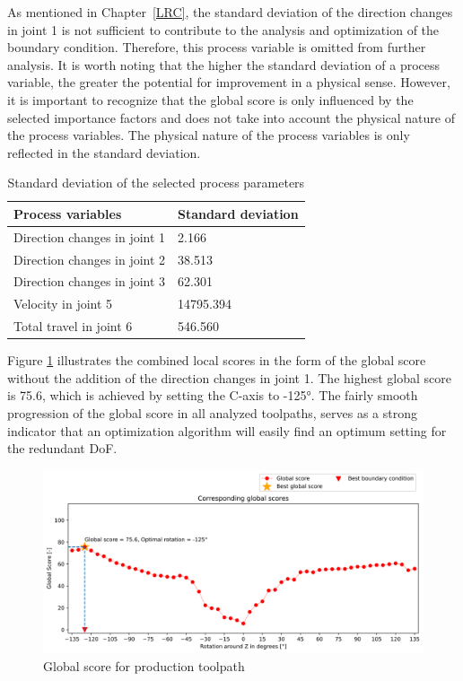 As mentioned in Chapter~\ref{LRC}, the standard deviation of the direction changes in joint 1 is not sufficient to contribute to the analysis and optimization of the boundary condition. Therefore, this process variable is omitted from further analysis. It is worth noting that the higher the standard deviation of a process variable, the greater the potential for improvement in a physical sense. However, it is important to recognize that the global score is only influenced by the selected importance factors and does not take into account the physical nature of the process variables. The physical nature of the process variables is only reflected in the standard deviation.

\begin{table}[H]
	\centering
	\caption{Standard deviation of the selected process parameters}
	\begin{tabular}{||l|l||}
		Process variables & Standard deviation \\
		\hline
		\hline
		\hline
		Direction changes in joint 1	&		2.166 \\
		Direction changes in joint 2	&		38.513 \\
		Direction changes in joint 3	&		62.301 \\
		Velocity in joint 5	&		14795.394 \\
		Total travel in joint 6	&		546.560 \\
		\hline
		\hline
	\end{tabular}
	
	
	\label{Stand}
\end{table}

Figure \ref{GS4} illustrates the combined local scores in the form of the global score without the addition of the direction changes in joint 1. The highest global score is 75.6, which is achieved by setting the C-axis to -125°. %
The fairly smooth progression of the global score in all analyzed toolpaths, serves as a strong indicator that an optimization algorithm will easily find an optimum setting for the redundant \acrshort{DoF}.

\begin{figure}[H]
	\centerline{\includegraphics[width=1\textwidth]{figures/best_c_4.png}}
	\caption{Global score for production toolpath}
	\label{GS4}
\end{figure}


